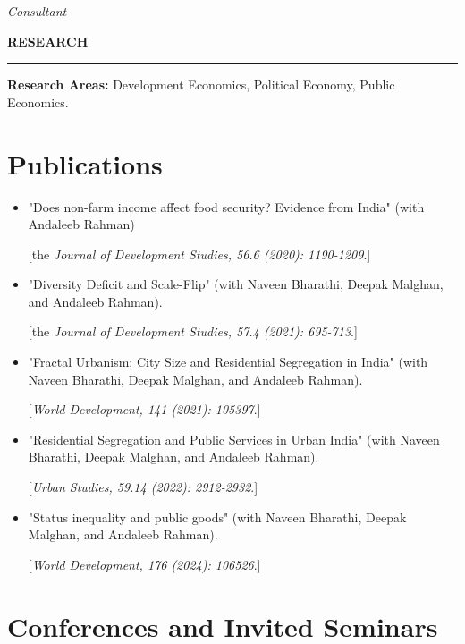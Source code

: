 \documentclass[10pt]{article}
\begin{document}
\textit{Consultant}


\clearpage

\begin{large}{\bf RESEARCH}\end{large}
\vspace{3pt}
  \hrule

\textbf{Research Areas:} Development Economics, Political Economy,
Public Economics.

\section*{\sc Publications}
\begin{itemize}
\item[1] "Does non-farm income affect food security? Evidence from India" (with Andaleeb Rahman) 

[the \textit{Journal of Development Studies, 56.6 (2020): 1190-1209}.] 

\item[2] "Diversity Deficit and Scale-Flip" (with Naveen Bharathi, Deepak Malghan, and Andaleeb Rahman).

[the \textit{Journal of Development Studies, 57.4 (2021): 695-713}.] 


\item[3] "Fractal Urbanism: City Size and Residential Segregation in India" (with Naveen Bharathi, Deepak Malghan, and Andaleeb Rahman).

[\textit{World Development, 141 (2021): 105397}.]

\item[4] "Residential Segregation and Public Services in Urban India" (with Naveen Bharathi, Deepak Malghan, and Andaleeb Rahman).

[\textit{Urban Studies, 59.14 (2022): 2912-2932}.]


\item[5] "Status inequality and public goods" (with Naveen Bharathi, Deepak Malghan, and Andaleeb Rahman).

[\textit{World Development, 176 (2024): 106526}.]

\end{itemize}

\section*{\sc Conferences and Invited Seminars}
\end{document}
